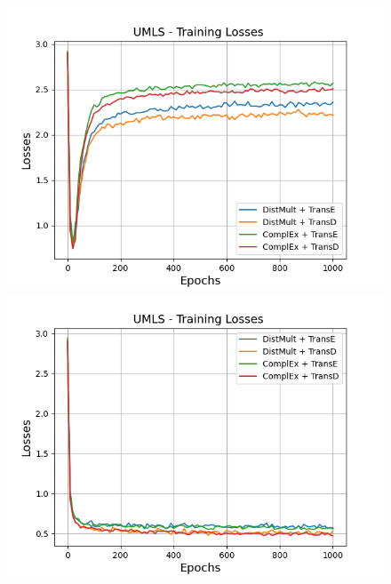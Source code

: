 \begin{figure}[H]
    \centering
    \begin{minipage}{.5\textwidth}
      \centering
      \includegraphics[width=0.9\linewidth]{figures/results/gan_train/not_pretrained/random/umls/epochs1000/random_umls_losses.png}
    \end{minipage}%
    \begin{minipage}{.5\textwidth}
      \centering
      \includegraphics[width=0.9\linewidth]{figures/results/gan_train/not_pretrained/uncertainty/max_distribution/entropy/umls/1k_epochs/uncertainty_umls_losses.png}
    \end{minipage}
    \begin{minipage}{.5\textwidth}
      \centering

\end{minipage}
\end{figure}
